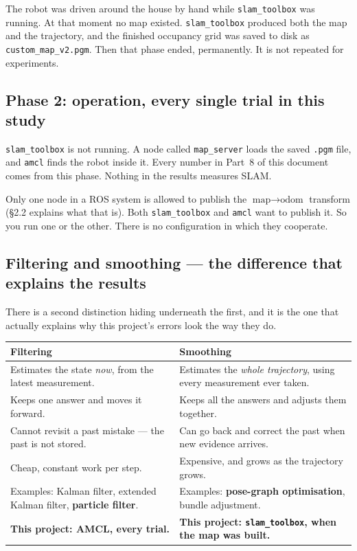 \documentclass[11pt,a4paper]{report}
\newcommand{\file}[1]{\texttt{\small #1}}
\begin{document}
The robot was driven around the house by hand while \file{slam\_toolbox} was
running. At that moment no map existed. \file{slam\_toolbox} produced both the
map and the trajectory, and the finished occupancy grid was saved to disk as
\file{custom\_map\_v2.pgm}. Then that phase ended, permanently. It is not
repeated for experiments.

\subsection{Phase 2: operation, every single trial in this study}

\file{slam\_toolbox} is not running. A node called \file{map\_server} loads
the saved \file{.pgm} file, and \file{amcl} finds the robot inside it. Every
number in Part~8 of this document comes from this phase. Nothing in the
results measures SLAM.

\begin{warnbox}
Only one node in a ROS system is allowed to publish the
$\text{map} \rightarrow \text{odom}$ transform (\S2.2 explains what that is).
Both \file{slam\_toolbox} and \file{amcl} want to publish it. So you run one or
the other. There is no configuration in which they cooperate.
\end{warnbox}

\subsection{Filtering and smoothing --- the difference that explains the results}

There is a second distinction hiding underneath the first, and it is the one
that actually explains why this project's errors look the way they do.

\begin{center}
\small
\begin{tabular}{@{}p{}p{}@{}}
\toprule
\textbf{Filtering} & \textbf{Smoothing} \\
\midrule
Estimates the state \emph{now}, from the latest measurement.
& Estimates the \emph{whole trajectory}, using every measurement ever taken. \\[4pt]
Keeps one answer and moves it forward.
& Keeps all the answers and adjusts them together. \\[4pt]
Cannot revisit a past mistake --- the past is not stored.
& Can go back and correct the past when new evidence arrives. \\[4pt]
Cheap, constant work per step.
& Expensive, and grows as the trajectory grows. \\[4pt]
Examples: Kalman filter, extended Kalman filter, \textbf{particle filter}.
& Examples: \textbf{pose-graph optimisation}, bundle adjustment. \\
\midrule
\textbf{This project: AMCL, every trial.}
& \textbf{This project: \file{slam\_toolbox}, when the map was built.} \\
\bottomrule
\end{tabular}
\end{center}
\end{document}
